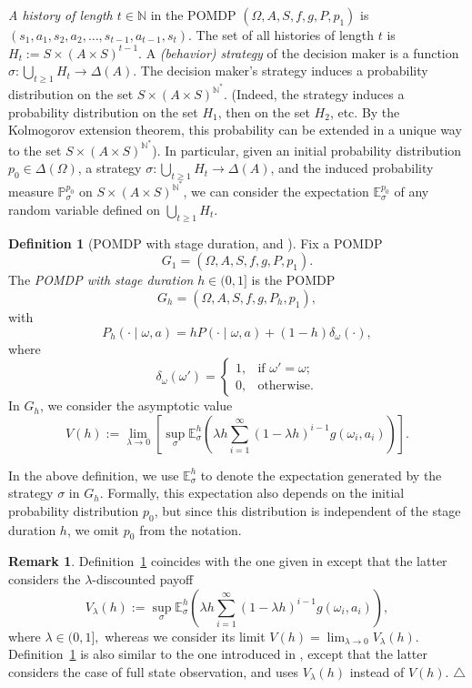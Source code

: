 \documentclass[english,openary,11pt]{article}
\newcommand\xqed[1]{%
  \leavevmode\unskip\penalty9999 \hbox{}\nobreak\hfill
  \quad\hbox{#1}}
\newcommand\demo{\xqed{$\triangle$}}
\newcommand{\demoo}{\tag*{$\triangle$}}
\theoremstyle{definition}
\newtheorem{remark}{Remark}
\newtheorem{definition}{Definition}
\newcommand{\N}{\mathbb{N}}
\newcommand{\E}{\mathbb{E}}
\renewcommand{\P}{\mathbb{P}}
\begin{document}
\emph{A history of length $t \in \N$} in the POMDP $(\Omega, A, S, f, g, P, p_1)$ is
$(s_1, a_1, s_2, a_2, \ldots, s_{t-1}, a_{t-1}, s_t)$.
The set of all histories of length $t$ is 
$H_t := S \times (A \times S)^{t-1}$.
A \emph{(behavior) strategy} of the decision maker is a function 
$\sigma : \bigcup_{t \ge 1} H_t \to \Delta(A)$.
The decision maker's strategy induces a probability distribution on the set $S \times (A \times S)^{\N^*}$. (Indeed, the strategy induces a probability distribution on the set $H_1$, then on the set $H_2$, etc. By the Kolmogorov extension theorem, this probability can be extended in a unique way to the set 
$S \times (A \times S)^{\N^*}$). In particular, given an initial probability distribution $p_0 \in \Delta(\Omega)$, a strategy
$\sigma : \bigcup_{t \ge 1} H_t \to \Delta(A)$, 
and the induced probability measure $\P^{p_0}_{\sigma}$ on $S \times (A \times S)^{\N^*}$, we can consider the expectation $\E^{p_0}_{\sigma}$ of any random variable defined on $\bigcup_{t \ge 1} H_t$.

\begin{definition}[POMDP with stage duration, {\cite[Definition~1]{Nov24b}} and {\cite[p. 240]{Ney13}}]
Fix a POMDP 
$$G_1 = (\Omega, A, S, f, g, P, p_1).$$
The \emph{POMDP with stage duration} $h \in (0,1]$ is the POMDP
$$G_h = (\Omega, A, S, f, g, P_h, p_1),$$
with
$$P_h (\cdot \mid \omega, a) = h P(\cdot \mid \omega, a) + (1-h) \delta_\omega (\cdot),$$
where 
$$\delta_\omega (\omega') = 
\begin{cases}
1, &\text{if } \omega' = \omega; \\
0, &\text{otherwise.}
\end{cases}$$
In $G_h$, we consider the asymptotic value
\[V(h) := \lim_{\lambda \to 0} \left[ \sup_\sigma \E_\sigma^{h} \left( \lambda h \sum_{i = 1}^{\infty} (1-\lambda h)^{i-1} g(\omega_i, a_i) \right)\right]. \demoo\]
\label{klp01}
\end{definition}

In the above definition, we use $\E_\sigma^{h}$ to denote the expectation generated by the strategy $\sigma$ in $G_h$. Formally, this expectation also depends on the initial probability distribution $p_0$, but since this distribution is independent of the stage duration $h$, we omit $p_0$ from the notation.

\begin{remark}
Definition~\ref{klp01} coincides with the one given in \cite{Nov24b} except that the latter considers the $\lambda$-discounted payoff
$$V_\lambda(h) := \sup_\sigma \E_\sigma^{h} \left( \lambda h \sum_{i = 1}^{\infty} (1-\lambda h)^{i-1} g(\omega_i, a_i) \right),$$
where $\lambda \in (0,1],$ 
whereas we consider its limit $V(h) =  \lim_{\lambda \to 0} V_\lambda(h).$ 
Definition~\ref{klp01} is also similar to the one introduced in \cite{Ney13}, except that the latter considers the case of full state observation, and uses $V_\lambda(h)$ instead of $V(h)$. \demo
\end{remark}
\end{document}
